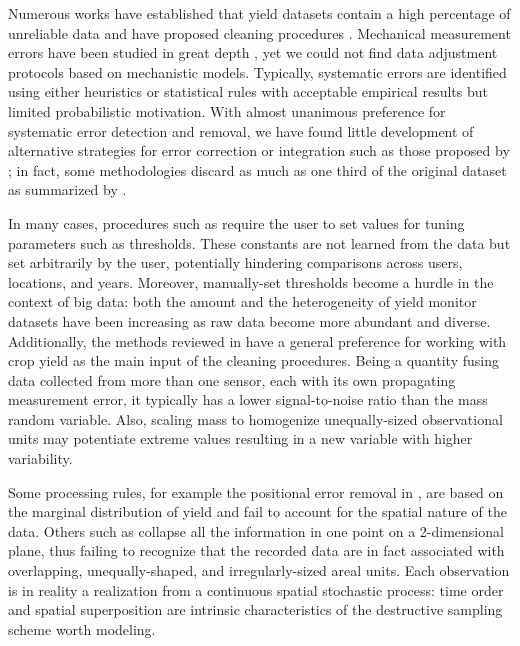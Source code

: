 Numerous works have established that yield datasets contain a high
percentage of unreliable data and have proposed cleaning procedures
\citep{Blackmore1996, Moore1998, Blackmore1999, Thylen2000, Noack2003,
  Simbahan2004, Ping2005, Sudduth2007, Sudduth2012, Spekken2013,
  Leroux2018, Leroux2019, Vega2019}. Mechanical measurement errors
have been studied in great depth \citep{Arslan1999, Arslan2002,
  Grisso2002, Burks2004, Hemming2005, Fulton2009, Schuster2017}, yet
we could not find data adjustment protocols based on mechanistic
models. Typically, systematic errors are identified using either
heuristics or statistical rules with acceptable empirical results but
limited probabilistic motivation. With almost unanimous preference for
systematic error detection and removal, we have found little
development of alternative strategies for error correction or
integration such as those proposed by \cite{Bachmaier2007,
  Bachmaier2010}; in fact, some methodologies discard as much as one
third of the original dataset as summarized by \cite{Lyle2013}.

In many cases, procedures such as \citep{Vega2019} require the user to
set values for tuning parameters such as thresholds. These constants
are not learned from the data but set arbitrarily by the user,
potentially hindering comparisons across users, locations, and
years. Moreover, manually-set thresholds become a hurdle in the
context of big data: both the amount and the heterogeneity of yield
monitor datasets have been increasing as raw data become more abundant
and diverse. Additionally, the methods reviewed in \citep{Lyle2013}
have a general preference for working with crop yield as the main
input of the cleaning procedures. Being a quantity fusing data
collected from more than one sensor, each with its own propagating
measurement error, it typically has a lower signal-to-noise ratio than
the mass random variable. Also, scaling mass to homogenize
unequally-sized observational units may potentiate extreme values
resulting in a new variable with higher variability.

Some processing rules, for example the positional error removal in
\citep{Blackmore1999}, are based on the marginal distribution of yield
and fail to account for the spatial nature of the data. Others such as
\citep{Leroux2018, Vega2019} collapse all the information in one
point on a 2-dimensional plane, thus failing to recognize that the
recorded data are in fact associated with overlapping,
unequally-shaped, and irregularly-sized areal units. Each observation
is in reality a realization from a continuous spatial stochastic
process: time order and spatial superposition are intrinsic
characteristics of the destructive sampling scheme worth modeling.

